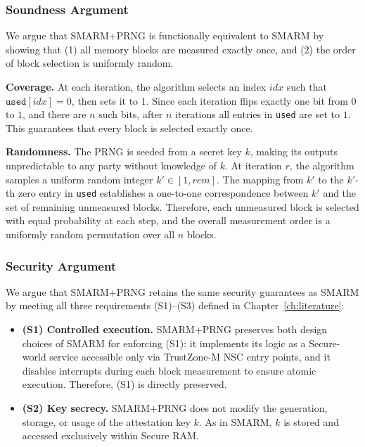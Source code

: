 \documentclass[a4paper,10pt]{article}
\begin{document}
{\subsubsection{Soundness Argument}

We argue that SMARM+PRNG is functionally equivalent 
to SMARM by showing that (1) all memory blocks are measured exactly 
once, and (2) the order of block selection is uniformly random.

\textbf{Coverage.} At each iteration, the algorithm selects an 
index $\mathit{idx}$ such that $\texttt{used}[\mathit{idx}] = 0$, 
then sets it to $1$. Since each iteration flips exactly one bit 
from $0$ to $1$, and there are $n$ such bits, after $n$ iterations 
all entries in \texttt{used} are set to $1$. This guarantees that 
every block is selected exactly once.

\textbf{Randomness.} The PRNG is seeded from a secret key $k$, 
making its outputs unpredictable to any party without knowledge 
of $k$. At iteration $r$, the algorithm samples a uniform random 
integer $k' \in [1, \mathit{rem}]$. The mapping from $k'$ to the 
$k'$-th zero entry in \texttt{used} establishes a one-to-one 
correspondence between $k'$ and the set of remaining unmeasured 
blocks. Therefore, each unmeasured block is selected with equal 
probability at each step, and the overall measurement order is a 
uniformly random permutation over all $n$ blocks.

\subsubsection{Security Argument}

We argue that SMARM+PRNG retains the same security 
guarantees as SMARM by meeting all three requirements 
(S1)--(S3) defined in Chapter~\ref{ch:literature}:

\begin{itemize}
    \item \textbf{(S1) Controlled execution.} 
    SMARM+PRNG preserves both design choices of 
    SMARM for enforcing (S1): it implements its logic as a 
    Secure-world service accessible only via TrustZone-M NSC 
    entry points, and it disables interrupts during each block 
    measurement to ensure atomic execution. Therefore, (S1) is 
    directly preserved.
    
    \item \textbf{(S2) Key secrecy.} 
    SMARM+PRNG does not modify the generation, 
    storage, or usage of the attestation key $k$. As in SMARM, 
    $k$ is stored and accessed exclusively within Secure RAM.
    

\end{itemize}}
\end{document}
